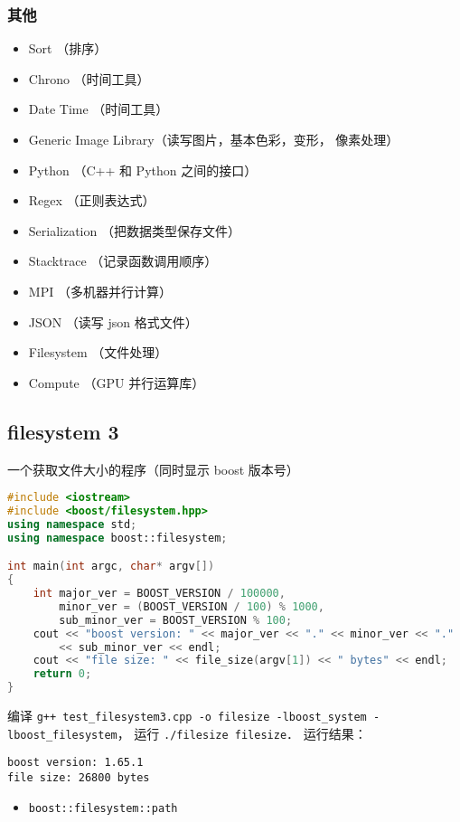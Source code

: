 \subsubsection{其他}
\begin{itemize}
\item Sort （排序）
\item Chrono （时间工具）
\item Date Time （时间工具）
\item Generic Image Library（读写图片，基本色彩，变形， 像素处理）
\item Python （C++ 和 Python 之间的接口）
\item Regex （正则表达式）
\item Serialization （把数据类型保存文件）
\item Stacktrace （记录函数调用顺序）
\item MPI （多机器并行计算）
\item JSON （读写 json 格式文件）
\item Filesystem （文件处理）
\item Compute （GPU 并行运算库）
\end{itemize}


\subsection{filesystem 3}
一个获取文件大小的程序（同时显示 boost 版本号）
\begin{lstlisting}[language=cpp, caption=test\_filesystem3.cpp]
#include <iostream>
#include <boost/filesystem.hpp>
using namespace std;
using namespace boost::filesystem;

int main(int argc, char* argv[])
{
	int major_ver = BOOST_VERSION / 100000,
        minor_ver = (BOOST_VERSION / 100) % 1000,
		sub_minor_ver = BOOST_VERSION % 100;
	cout << "boost version: " << major_ver << "." << minor_ver << "."
        << sub_minor_ver << endl;
	cout << "file size: " << file_size(argv[1]) << " bytes" << endl;
	return 0;
}
\end{lstlisting}

编译 \verb|g++ test_filesystem3.cpp -o filesize -lboost_system -lboost_filesystem|， 运行 \verb|./filesize filesize|． 运行结果：
\begin{lstlisting}[language=none]
boost version: 1.65.1
file size: 26800 bytes
\end{lstlisting}

\begin{itemize}
\item \verb|boost::filesystem::path|
\end{itemize}

